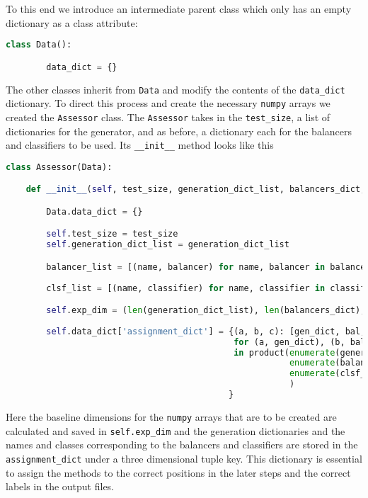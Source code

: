 To this end we introduce an intermediate parent class which only has an empty dictionary as a class attribute:
\begin{lstlisting}[language=Python, numbers=none]
class Data():

    	data_dict = {}
\end{lstlisting}

The other classes inherit from \texttt{Data} and modify the contents of the \texttt{data\_dict} dictionary.
To direct this process and create the necessary \texttt{numpy} arrays we created the \texttt{Assessor} class.
The \texttt{Assessor} takes in the \texttt{test\_size}, a list of dictionaries for the generator, and as before, a dictionary each for the balancers and classifiers to be used.
Its \texttt{\_\_init\_\_} method looks like this

\begin{lstlisting}[language=Python, numbers=none]
class Assessor(Data):

    def __init__(self, test_size, generation_dict_list, balancers_dict, classifiers_dict):

        Data.data_dict = {}

        self.test_size = test_size
        self.generation_dict_list = generation_dict_list

        balancer_list = [(name, balancer) for name, balancer in balancers_dict.items()]
        
        clsf_list = [(name, classifier) for name, classifier in classifiers_dict.items()]

        self.exp_dim = (len(generation_dict_list), len(balancers_dict), len(classifiers_dict))
        
        self.data_dict['assignment_dict'] = {(a, b, c): [gen_dict, bal, clsf]
                                             for (a, gen_dict), (b, bal), (c, clsf)
                                             in product(enumerate(generation_dict_list), 
                                                        enumerate(balancer_list), 
                                                        enumerate(clsf_list)
                                                        )
                                            }

\end{lstlisting}

Here the baseline dimensions for the \texttt{numpy} arrays that are to be created are calculated and saved in \texttt{self.exp\_dim} and 
the generation dictionaries and the names and classes corresponding to the balancers and classifiers are stored in the \texttt{assignment\_dict} 
under a three dimensional tuple key. 
This dictionary is essential to assign the methods to the correct positions in the later steps and the correct labels in the output files.

